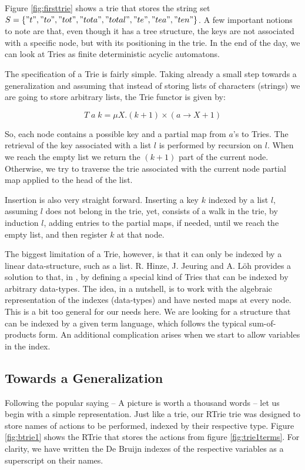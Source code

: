 Figure \ref{fig:firsttrie} shows a trie that stores the string set 
$S = \{ "t" , "to" , "tot" , "tota" , "total" , "te" , "tea" , "ten" \}$.
A few important notions to note are that, even though it has a tree structure, the keys are
not associated with a specific node, but with its positioning in the trie.
In the end of the day, we can look at Tries as finite deterministic acyclic automatons.

The specification of a Trie is fairly simple. Taking already a small step towards a generalization
and assuming that instead of storing lists of characters (strings) we are going to store arbitrary
lists, the Trie functor is given by:

\[
  T\;a\;k = \mu X . (k + 1) \times (a \rightarrow X + 1)
\]

So, each node contains a possible key and a partial map from $a$'s to Tries. The retrieval of
the key associated with a list $l$ is performed by recursion on $l$. When we reach the empty list
we return the $(k+1)$ part of the current node. Otherwise, we try to traverse the trie associated with the
current node partial map applied to the head of the list. 

Insertion is also very straight forward. Inserting a key $k$ indexed by a list $l$, assuming $l$ does not belong
in the trie, yet, consists of a walk in the trie, by induction $l$, adding entries to the partial maps, if needed,
until we reach the empty list, and then register $k$ at that node.

The biggest limitation of a Trie, however, is that it can only be indexed by a linear data-structure, 
such as a list. R. Hinze, J. Jeuring and A. L\"{o}h provides a solution to that, in \cite{Hinze04}, 
by defining a special kind of Tries that can be indexed by arbitrary data-types. The idea, in a nutshell,
is to work with the algebraic representation of the indexes (data-types) and have nested maps at every node.
This is a bit too general for our needs here. We are looking for a structure that can be indexed
by a given term language, which follows the typical sum-of-products form. An additional complication
arises when we start to allow variables in the index.

\subsection{Towards a Generalization}

Following the popular saying -- A picture is worth a thousand words -- let us begin
with a simple representation. Just like a trie, our RTrie trie was designed to
store names of actions to be performed, indexed by their respective type. Figure 
\ref{fig:btrie1} shows the RTrie that stores the actions from figure \ref{fig:trie1terms}.
For clarity, we have written the De Bruijn indexes of the respective variables as a superscript on
their names.

